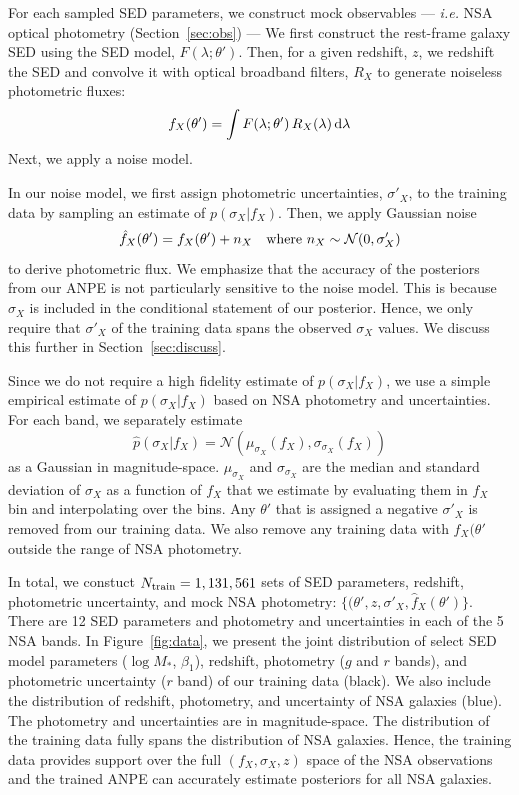 For each sampled SED parameters, we construct mock observables --- \emph{i.e.}
NSA optical photometry (Section~\ref{sec:obs}) --- 
We first construct the rest-frame galaxy SED using the SED model,
$F(\lambda;\theta')$. 
Then, for a given redshift, $z$, we redshift the SED and convolve it with
optical broadband filters, $R_X$ to generate noiseless photometric fluxes:
\begin{equation}
    f_X(\theta') = \int F(\lambda;\theta') \, R_X(\lambda) \, {\rm d}\lambda
\end{equation}
Next, we apply a noise model.

In our noise model, we first assign photometric uncertainties, $\sigma'_X$, to
the training data by sampling an estimate of $p(\sigma_X | f_X)$. 
Then, we apply Gaussian noise
\begin{equation}
    \hat{f}_X(\theta') = f_X(\theta') + n_X  \quad {\rm where}~n_X \sim \mathcal{N}(0, \sigma'_X)
\end{equation}
to derive photometric flux.
We emphasize that the accuracy of the posteriors from our ANPE is not
particularly sensitive to the noise model. 
This is because $\sigma_X$ is included in the conditional statement of our
posterior. 
Hence,  we only require that $\sigma'_X$ of the training data spans the observed
$\sigma_X$ values. 
We discuss this further in Section~\ref{sec:discuss}.

Since we do not require a high fidelity estimate of $p(\sigma_X | f_X)$, we use
a simple empirical estimate of $p(\sigma_X | f_X)$ based on NSA photometry and
uncertainties. 
For each band, we separately estimate  
\begin{equation}
    \hat{p}(\sigma_X | f_X) = \mathcal{N}( \mu_{\sigma_X}(f_X), \sigma_{\sigma_X}(f_X))
\end{equation}
as a Gaussian in magnitude-space. 
$\mu_{\sigma_X}$ and $\sigma_{\sigma_X}$ are the median and standard deviation
of $\sigma_X$ as a function of $f_X$ that we estimate by evaluating them in
$f_X$ bin and interpolating over the bins. 
Any $\theta'$ that is assigned a negative $\sigma'_X$ is removed from our
training data. 
We also remove any training data with $f_X(\theta'$ outside the range of NSA
photometry. 

In total, we constuct $N_{\rm train} = 1,131,561$ sets of SED parameters,
redshift, photometric uncertainty, and mock NSA photometry: 
$\{(\theta', z, \sigma'_X, \hat{f}_X(\theta') \}$.
There are 12 SED parameters and photometry and uncertainties in each of the 5
NSA bands. 
In Figure~\ref{fig:data}, we present the joint distribution of select SED model
parameters ($\log M_*$, $\beta_1$), redshift, photometry ($g$ and $r$ bands),
and photometric uncertainty ($r$ band) of our training data (black).
We also include the distribution of redshift, photometry, and uncertainty of
NSA galaxies (blue).
The photometry and uncertainties are in magnitude-space. 
The distribution of the training data fully spans the distribution of NSA
galaxies.
Hence, the training data provides support over the full $(f_X, \sigma_X, z)$
space of the NSA observations and the trained ANPE can accurately estimate
posteriors for all NSA galaxies. 


